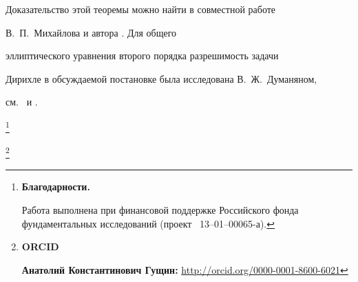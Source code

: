 \smallskip



Доказательство этой теоремы можно найти в совместной работе

В.~П.~Михайлова и автора \cite{gushin:GM91}. Для общего

эллиптического уравнения второго порядка разрешимость задачи

Дирихле в обсуждаемой постановке была исследована В.~Ж.~Думаняном,

см.~\cite{gushin:Dum} и \cite{gushin:Dum2}.





\thanks{\textbf{Благодарности.} 

Работа выполнена при финансовой поддержке Российского фонда фундаментальных исследований (проект \No~13--01--00065-а).}



\thanks{{\bf ORCID}



{\bf Анатолий Константинович Гущин:} \url{http://orcid.org/0000-0001-8600-6021}





}







\RusRef







